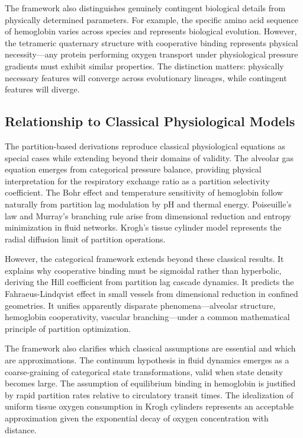 \documentclass[10pt,twocolumn,a4paper]{article}
\theoremstyle{remark}
\begin{document}
The framework also distinguishes genuinely contingent biological details from physically determined parameters. For example, the specific amino acid sequence of hemoglobin varies across species and represents biological evolution. However, the tetrameric quaternary structure with cooperative binding represents physical necessity—any protein performing oxygen transport under physiological pressure gradients must exhibit similar properties. The distinction matters: physically necessary features will converge across evolutionary lineages, while contingent features will diverge.

\subsection{Relationship to Classical Physiological Models}

The partition-based derivations reproduce classical physiological equations as special cases while extending beyond their domains of validity. The alveolar gas equation emerges from categorical pressure balance, providing physical interpretation for the respiratory exchange ratio as a partition selectivity coefficient. The Bohr effect and temperature sensitivity of hemoglobin follow naturally from partition lag modulation by pH and thermal energy. Poiseuille's law and Murray's branching rule arise from dimensional reduction and entropy minimization in fluid networks. Krogh's tissue cylinder model represents the radial diffusion limit of partition operations.

However, the categorical framework extends beyond these classical results. It explains why cooperative binding must be sigmoidal rather than hyperbolic, deriving the Hill coefficient from partition lag cascade dynamics. It predicts the Fahraeus-Lindqvist effect in small vessels from dimensional reduction in confined geometries. It unifies apparently disparate phenomena—alveolar structure, hemoglobin cooperativity, vascular branching—under a common mathematical principle of partition optimization.

The framework also clarifies which classical assumptions are essential and which are approximations. The continuum hypothesis in fluid dynamics emerges as a coarse-graining of categorical state transformations, valid when state density becomes large. The assumption of equilibrium binding in hemoglobin is justified by rapid partition rates relative to circulatory transit times. The idealization of uniform tissue oxygen consumption in Krogh cylinders represents an acceptable approximation given the exponential decay of oxygen concentration with distance.
\end{document}
